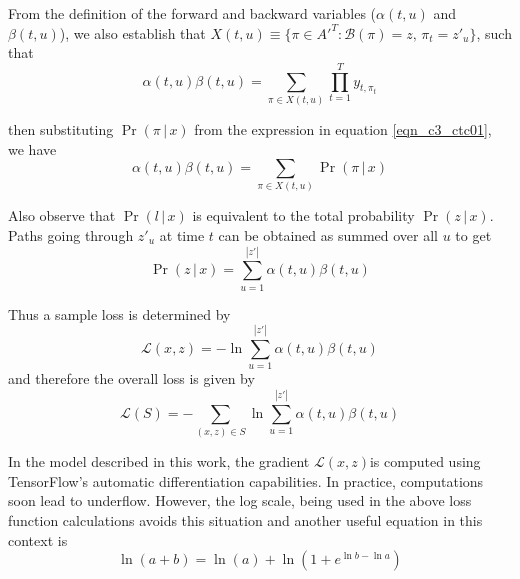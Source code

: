 From the definition of the forward and backward variables ($\alpha(t, u)$ and $\beta(t, u)$), we also establish that $X(t,u) \equiv \{ \pi \in A'^T : \mathcal{B}(\pi) = z, \, \pi_t = z'_u \}$, such that
\begin{equation}
\alpha(t, u) \beta(t, u) = \sum_{\pi \in X(t,u)} \prod_{t = 1}^{T} y_{t, \pi_t}\label{eqn_c3_ctc13}\end{equation}

then substituting $\Pr(\pi \, | \, x)$ from the expression in equation \ref{eqn_c3_ctc01}, we have
\begin{equation}
\alpha(t, u) \beta(t, u) = \sum_{\pi \in X(t,u)} \Pr(\pi \, | \, x)
\label{eqn_c3_ctc14}\end{equation}

Also observe that $\Pr(l \, | \, x)$ is equivalent to the total probability $\Pr(z \, | \, x)$. Paths going through $z'_u$ at time $t$ can be obtained as summed over all $u$ to get
\begin{equation}
\Pr(z \, | \, x) = \sum_{u = 1}^{|z'|} \alpha(t, u) \beta(t, u)
\label{eqn_c3_ctc15}\end{equation}

Thus a sample loss is determined by
\begin{equation}
\mathcal{L}(x, z) = - \ln \sum_{u = 1}^{|z'|} \alpha(t, u) \beta(t, u)\label{eqn_c3_ctc16}
\end{equation}
and therefore the overall loss is given by
\begin{equation}\mathcal{L}(S) = -\sum_{(x,z) \in S} \ln \sum_{u = 1}^{|z'|} \alpha(t, u) \beta(t, u)
\label{eqn_c3_ctc17}\end{equation}

In the model described in this work, the gradient $\mathcal{L}(x, z)$is computed using TensorFlow's automatic differentiation capabilities. In practice, computations soon lead to underflow.  However, the log scale, being used in the above loss function calculations avoids this situation and another useful equation in this context is
\begin{equation}
\ln(a + b) = \ln(a) + \ln(1 + e^{\ln b - \ln a})
\label{eqn_c3_ctc18}\end{equation}
